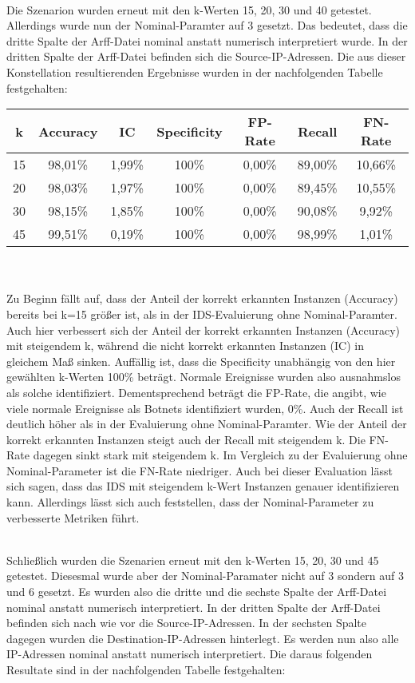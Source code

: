 \documentclass[main.tex]{subfiles}
\begin{document}
\ \\  Die Szenarion wurden erneut mit den k-Werten 15, 20, 30 und 40 getestet. Allerdings wurde nun der Nominal-Paramter auf 3 gesetzt. Das bedeutet, dass die dritte Spalte der Arff-Datei nominal anstatt numerisch interpretiert wurde. In der dritten Spalte der Arff-Datei befinden sich die Source-IP-Adressen. Die aus dieser Konstellation resultierenden Ergebnisse wurden in der nachfolgenden Tabelle festgehalten: \\

\begin{tabular}{|c|c|c|c|c|c|c|}\hline
k & Accuracy & IC & Specificity & FP-Rate & Recall & FN-Rate \\ \hline
15 & 98,01\% & 1,99\% & 100\% & 0,00\% & 89,00\% & 10,66\% \\  \hline
20 & 98,03\% & 1,97\% & 100\% & 0,00\% & 89,45\% & 10,55\% \\  \hline
30 &  98,15\% & 1,85\% & 100\% & 0,00\% & 90,08\% & 9,92\% \\  \hline
45 & 99,51\% & 0,19\% & 100\% & 0,00\% & 98,99\% & 1,01\%\\  \hline
 \end{tabular} 

\ \\ \\ Zu Beginn fällt auf, dass der Anteil der korrekt erkannten Instanzen (Accuracy) bereits bei k=15 größer ist, als in der IDS-Evaluierung ohne Nominal-Paramter. Auch hier verbessert sich der Anteil der korrekt erkannten Instanzen (Accuracy) mit steigendem k, während die nicht korrekt erkannten Instanzen (IC) in gleichem Maß sinken. Auffällig ist, dass die Specificity unabhängig von den hier gewählten k-Werten 100\% beträgt. Normale Ereignisse wurden also ausnahmslos als solche identifiziert. Dementsprechend beträgt die FP-Rate, die angibt, wie viele normale Ereignisse als Botnets identifiziert wurden, 0\%. Auch der Recall ist deutlich höher als in der Evaluierung ohne Nominal-Paramter. Wie der Anteil der korrekt erkannten Instanzen steigt auch der Recall mit steigendem k. Die FN-Rate dagegen sinkt stark mit steigendem k. Im Vergleich zu der Evaluierung ohne Nominal-Parameter ist die FN-Rate niedriger. Auch bei dieser Evaluation lässt sich sagen, dass das IDS mit steigendem k-Wert Instanzen genauer identifizieren kann. Allerdings lässt sich auch feststellen, dass der Nominal-Parameter zu verbesserte Metriken führt.

\ \\ Schließlich wurden die Szenarien erneut mit den k-Werten 15, 20, 30 und 45 getestet. Diesesmal wurde aber der Nominal-Paramater nicht auf 3 sondern auf 3 und 6 gesetzt. Es wurden also die dritte und die sechste Spalte der Arff-Datei nominal anstatt numerisch interpretiert. In der dritten Spalte der Arff-Datei befinden sich nach wie vor die Source-IP-Adressen. In der sechsten Spalte dagegen wurden die Destination-IP-Adressen hinterlegt. Es werden nun also alle IP-Adressen nominal anstatt numerisch interpretiert. Die daraus folgenden Resultate sind in der nachfolgenden Tabelle festgehalten:  \\
\end{document}
